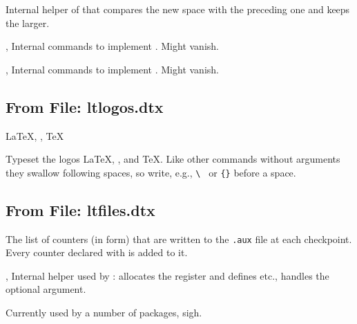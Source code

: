 \documentclass{l3in2edoc}
\begin{document}
\begin{function}[int]
  {
    \@xaddvskip
  }
  Internal helper of  that compares the new space with
  the preceding one and keeps the larger.
\end{function}


\begin{function}[int]
  {
    \@vspace,
    \@vspacer
  }
  Internal commands to implement . Might vanish.
\end{function}


\begin{function}[int]
  {
    \@hspace,
    \@hspacer
  }
  Internal commands to implement . Might vanish.
\end{function}







\subsection{From File: ltlogos.dtx}


\begin{function}[user]
  {
    \LaTeX,
    \LaTeXe,
    \TeX
  }
  \begin{syntax}
  \end{syntax}
  Typeset the logos \LaTeX, \LaTeXe, and \TeX. Like other commands
  without arguments they swallow following spaces, so write, e.g.,
  \verb*=\ = or \texttt{\{\}} before a space.
\end{function}




\subsection{From File: ltfiles.dtx}


\begin{function}[]
  {
    \cl@@ckpt
  }
  The list of counters (in  form) that are written to the
  \texttt{.aux} file at each  checkpoint. Every counter
  declared with  is added to it.
\end{function}



\begin{function}[int]
  {
    \@newctr,
    \@definecounter
  }
  Internal helper used by : 
  allocates the register and defines  etc.,
   handles the optional  argument.

  Currently used by a number of packages, sigh.
\end{function}
\end{document}
